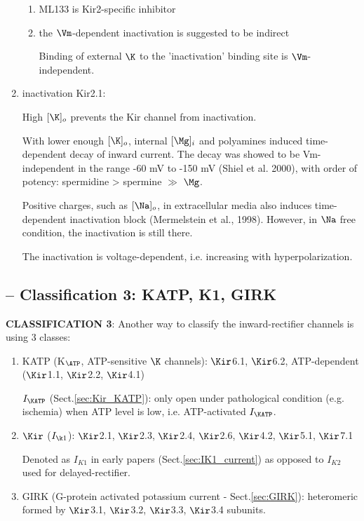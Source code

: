 \begin{enumerate}
\begin{enumerate}
    \item ML133 is Kir2-specific inhibitor
    
      
    \item the $\Vm$-dependent inactivation is suggested to be indirect
    
    Binding of external $\K$ to the 'inactivation' binding site is
    $\Vm$-independent. 
  \end{enumerate}
   
  \item inactivation Kir2.1:
  
High $[\K]_o$ prevents the Kir channel from inactivation. 

With lower enough $[\K]_o$, internal $[\Mg]_i$ and polyamines induced
time-dependent decay of inward current. The decay was showed to be
Vm-independent in the range -60 mV to -150 mV (Shiel et al. 2000), with order of
potency: spermidine > spermine $\gg$ $\Mg$.

Positive charges, such as $[\Na]_o$, in extracellular media also induces
time-dependent inactivation block (Mermelstein et al., 1998). However, in $\Na$
free condition, the inactivation is still there. 


The inactivation is voltage-dependent, i.e. increasing with hyperpolarization. 
\end{enumerate}

\subsection{-- Classification 3: KATP, K1, GIRK}
\label{sec:Kir-classification-3}

{\bf CLASSIFICATION 3}: Another way to classify the inward-rectifier channels is
using 3 classes:


\begin{enumerate}
  
  \item KATP (K$_\ATP$, ATP-sensitive $\K$ channels):
  $\Kir$6.1, $\Kir$6.2, ATP-dependent ($\Kir$1.1, $\Kir$2.2, $\Kir$4.1)

$I_\KATP$ (Sect.\ref{sec:Kir_KATP}):  only open under pathological condition
(e.g. ischemia) when ATP level is low, i.e. ATP-activated $I_\KATP$.


  \item $\Kir$ ($I_{\k1}$): $\Kir$2.1, $\Kir$2.3, $\Kir$2.4, $\Kir$2.6,
  $\Kir$4.2, $\Kir$5.1, $\Kir$7.1

Denoted as $I_{K1}$ in early papers (Sect.\ref{sec:IK1_current}) as opposed
to $I_{K2}$ used for delayed-rectifier.

  \item GIRK (G-protein activated potassium current -
  Sect.\ref{sec:GIRK}): heteromeric formed by
  $\Kir$3.1, $\Kir$3.2, $\Kir$3.3, $\Kir$3.4 subunits.
  
\end{enumerate}


